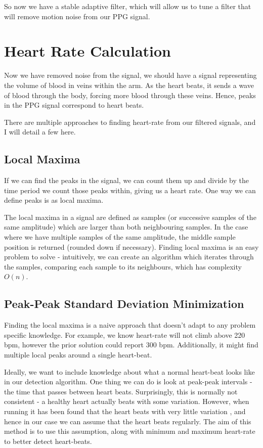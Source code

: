 \documentclass[12pt,a4paper,twoside,openright]{report}
\begin{document}
So now we have a stable adaptive filter, which will allow us to tune a filter
that will remove motion noise from our PPG signal.

\section{Heart Rate Calculation}

Now we have removed noise from the signal, we should have a signal 
representing the volume of blood in veins within the arm. As the heart beats,
it sends a wave of blood through the body, forcing more blood through these
veins. Hence, peaks in the PPG signal correspond to heart beats. 

There are multiple approaches to finding heart-rate from our filtered
signals, and I will detail a few here.

\subsection{Local Maxima}

If we can find the peaks in the signal, we can count them up and divide by the
time period we count those peaks within, giving us a heart rate. One way we
can define peaks is as local maxima.

The local maxima in a signal are defined as samples (or successive samples of
the same amplitude) which are larger than both
neighbouring samples. In the case where we have multiple samples of the same
amplitude, the middle
sample position is returned (rounded down if necessary).
Finding local maxima is an easy problem to solve - 
intuitively, we can create an algorithm which iterates through the samples,
comparing each sample to its neighbours, which has complexity \(O(n)\).

\subsection{Peak-Peak Standard Deviation Minimization}
\label{sec:sd-min}

Finding the local maxima is a naive approach that doesn't adapt to any problem
specific knowledge. For example, we know heart-rate will not climb above 220
bpm, however the prior solution could report 300 bpm. Additionally, it might
find multiple local peaks around a single heart-beat. 

Ideally, we want to include knowledge about what a normal heart-beat looks
like in our detection algorithm. One thing we can do is look at peak-peak
intervals - the time that passes between heart beats. Surprisingly, this is
normally not consistent - a healthy heart actually beats with some
variation. However, when running it has been found that the heart beats with
very little variation \cite{michael17}, and hence in our case we can assume that the heart
beats regularly. The aim of this method is to use this assumption, along with
minimum and maximum heart-rate to better detect heart-beats.
\end{document}
